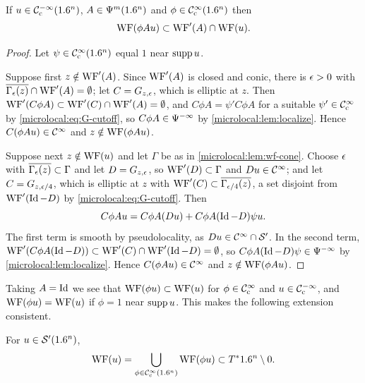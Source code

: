 \begin{proposition}\label{microlocal:prop:microlocal-compact}
  If $u\in\mathcal{C}^{-\infty}_{\mathrm{c}}(1.6^n)$, $A\in\Psi^{m}(1.6^n)$ and $\phi\in\mathcal{C}^\infty_{\mathrm{c}}(1.6^n)$ then
  \begin{equation*}
    \operatorname{WF}(\phi Au)\subset\operatorname{WF}'(A)\cap\operatorname{WF}(u).
  \end{equation*}
\end{proposition}
\begin{proof}
  Let $\psi\in\mathcal{C}^\infty_{\mathrm{c}}(1.6^n)$ equal $1$ near $\operatorname{supp} u$.

  Suppose first $z\notin\operatorname{WF}'(A)$. Since $\operatorname{WF}'(A)$ is closed and conic, there
  is $\epsilon>0$ with $\overline{\Gamma_\epsilon(z)}\cap\operatorname{WF}'(A)=\emptyset$; let
  $C=G_{z,\epsilon}$, which is elliptic at $z$. Then
  $\operatorname{WF}'(C\phi A)\subset\operatorname{WF}'(C)\cap\operatorname{WF}'(A)=\emptyset$, and $C\phi A=\psi'C\phi
  A$ for a suitable $\psi'\in\mathcal{C}^\infty_{\mathrm{c}}$ by \eqref{microlocal:eq:G-cutoff}, so
  $C\phi A\in\Psi^{-\infty}$ by \cref{microlocal:lem:localize}. Hence
  $C(\phi Au)\in\mathcal{C}^\infty$ and $z\notin\operatorname{WF}(\phi Au)$.

  Suppose next $z\notin\operatorname{WF}(u)$ and let $\Gamma$ be as in
  \cref{microlocal:lem:wf-cone}. Choose $\epsilon$ with
  $\overline{\Gamma_\epsilon(z)}\subset\Gamma$ and let $D=G_{z,\epsilon}$, so
  $\operatorname{WF}'(D)\subset\Gamma$ and $Du\in\mathcal{C}^\infty$; and let $C=G_{z,\epsilon/4}$, which is
  elliptic at $z$ with $\operatorname{WF}'(C)\subset\overline{\Gamma_{\epsilon/4}(z)}$, a set
  disjoint from $\operatorname{WF}'(\operatorname{Id}-D)$ by \eqref{microlocal:eq:G-cutoff}. Then
  \begin{equation*}
    C\phi Au=C\phi A(Du)+C\phi A(\operatorname{Id}-D)\psi u.
  \end{equation*}
  The first term is smooth by pseudolocality, as $Du\in\mathcal{C}^\infty\cap\mathcal{S}'$. In
  the second term,
  $\operatorname{WF}'(C\phi A(\operatorname{Id}-D))\subset\operatorname{WF}'(C)\cap\operatorname{WF}'(\operatorname{Id}-D)=\emptyset$, so
  $C\phi A(\operatorname{Id}-D)\psi\in\Psi^{-\infty}$ by \cref{microlocal:lem:localize}.
  Hence $C(\phi Au)\in\mathcal{C}^\infty$ and $z\notin\operatorname{WF}(\phi Au)$.
\end{proof}

Taking $A=\operatorname{Id}$ we see that $\operatorname{WF}(\phi u)\subset\operatorname{WF}(u)$ for $\phi\in\mathcal{C}^\infty_{\mathrm{c}}$ and
$u\in\mathcal{C}^{-\infty}_{\mathrm{c}}$, and $\operatorname{WF}(\phi u)=\operatorname{WF}(u)$ if $\phi=1$ near $\operatorname{supp} u$. This makes
the following extension consistent.

\begin{definition}\label{microlocal:def:wf}
  For $u\in\mathcal{S}'(1.6^n)$,
  \begin{equation*}
    \operatorname{WF}(u)=\bigcup_{\phi\in\mathcal{C}^\infty_{\mathrm{c}}(1.6^n)}\operatorname{WF}(\phi u)\subset T^*1.6^n\setminus0.
  \end{equation*}
\end{definition}

